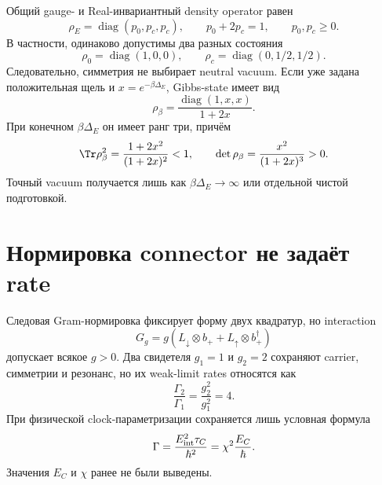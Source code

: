 Общий gauge- и Real-инвариантный density operator равен
\begin{equation}
 \rho_E=\operatorname{diag}(p_0,p_c,p_c),
 \qquad p_0+2p_c=1,\qquad p_0,p_c\geq0.
 \label{eq:v8-mediator-origin-state-simplex}
\end{equation}
В частности, одинаково допустимы два разных состояния
\begin{equation}
 \rho_0=\operatorname{diag}(1,0,0),
 \qquad
 \rho_c=\operatorname{diag}(0,1/2,1/2).
 \label{eq:v8-mediator-origin-state-witnesses}
\end{equation}
Следовательно, симметрия не выбирает neutral vacuum. Если уже задана
положительная щель и $x=e^{-\beta\Delta_E}$, Gibbs-state имеет вид
\begin{equation}
 \rho_{\beta}=\frac{\operatorname{diag}(1,x,x)}{1+2x}.
 \label{eq:v8-mediator-origin-gibbs-state}
\end{equation}
При конечном $\beta\Delta_E$ он имеет ранг три, причём
\begin{equation}
 \Tr\rho_\beta^2=\frac{1+2x^2}{(1+2x)^2}<1,
 \qquad
 \det\rho_\beta=\frac{x^2}{(1+2x)^3}>0.
 \label{eq:v8-mediator-origin-gibbs-purity}
\end{equation}
Точный vacuum получается лишь как $\beta\Delta_E\to\infty$ или отдельной
чистой подготовкой.

\section{Нормировка connector не задаёт rate}

Следовая Gram-нормировка фиксирует форму двух квадратур, но interaction
\begin{equation}
 G_g=g\left(L_\downarrow\otimes b_+
 +L_\uparrow\otimes b_+^\dagger\right)
 \label{eq:v8-mediator-origin-free-coupling}
\end{equation}
допускает всякое $g>0$. Два свидетеля $g_1=1$ и $g_2=2$ сохраняют carrier,
симметрии и резонанс, но их weak-limit rates относятся как
\begin{equation}
 \frac{\Gamma_2}{\Gamma_1}=\frac{g_2^2}{g_1^2}=4.
 \label{eq:v8-mediator-origin-rate-witness}
\end{equation}
При физической clock-параметризации сохраняется лишь условная формула
\begin{equation}
 \Gamma=\frac{E_{\rm int}^2\tau_C}{\hbar^2}
 =\chi^2\frac{E_C}{\hbar}.
 \label{eq:v8-mediator-origin-clock-rate}
\end{equation}
Значения $E_C$ и $\chi$ ранее не были выведены.

